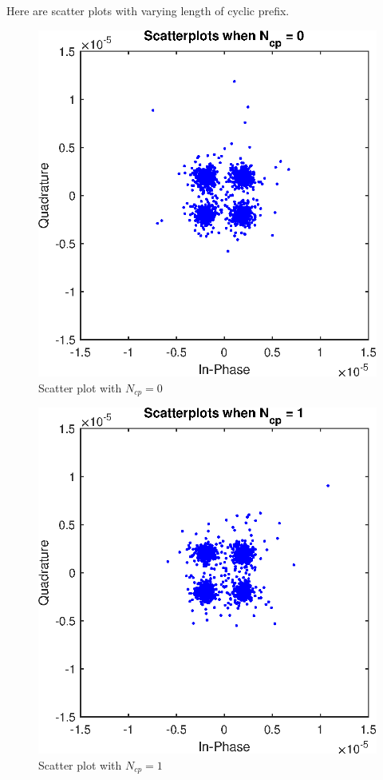 \documentclass[conference]{IEEEtran}
\begin{document}
\begin{appendices}
\section{}
\label{SCA_cp}
Here are scatter plots with varying length of cyclic prefix.
\begin{figure}[H]
    \centering
    \includegraphics[width=\linewidth]{images/scatter_Ncp0.eps}
    \caption{Scatter plot with $N_{cp} = 0$}
    \label{Ncp0}
\end{figure}

\begin{figure}[H]
    \centering
    \includegraphics[width=\linewidth]{images/scatter_Ncp1.eps}
    \caption{Scatter plot with $N_{cp} = 1$}
    \label{Ncp1}
\end{figure}


\end{appendices}
\end{document}
